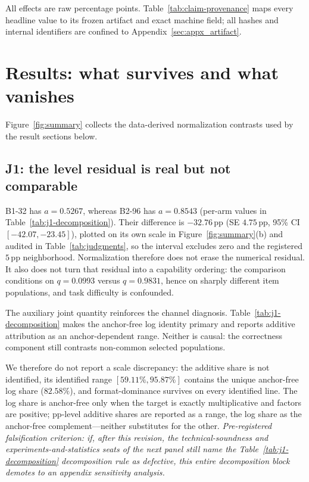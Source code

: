 \documentclass{article}
\newcommand{\pp}{\,\mathrm{pp}}
\begin{document}
All effects are raw percentage points.  Table~\ref{tab:claim-provenance}
maps every headline value to its frozen artifact and exact machine field; all
hashes and internal identifiers are confined to
Appendix~\ref{sec:appx_artifact}.

\section{Results: what survives and what vanishes}
\label{sec:results}

Figure~\ref{fig:summary} collects the data-derived normalization contrasts used
by the result sections below.

\subsection{J1: the level residual is real but not comparable}

\textsc{B1-32} has $a=0.5267$, whereas \textsc{B2-96} has $a=0.8543$
(per-arm values in Table~\ref{tab:j1-decomposition}).  Their difference
is $-32.76\pp$ (SE $4.75\pp$, 95\% CI $[-42.07,-23.45]$), plotted on its own
scale in Figure~\ref{fig:summary}(b) and audited in
Table~\ref{tab:judgments}, so the interval
excludes zero and the registered $5\pp$ neighborhood.  Normalization therefore
does not erase the numerical residual.  It also does not turn that residual
into a capability ordering: the comparison conditions on $q=0.0993$ versus
$q=0.9831$, hence on sharply different item populations, and task difficulty
is confounded.

The auxiliary joint quantity reinforces the channel diagnosis.  Table~\ref{tab:j1-decomposition}
makes the anchor-free log identity primary and reports additive attribution as
an anchor-dependent range.  Neither is causal: the correctness component still
contrasts non-common selected populations.

We therefore do not report a scale discrepancy: the additive share is not
identified, its identified range $[59.11\%,95.87\%]$ contains the unique
anchor-free log share ($82.58\%$), and format-dominance survives on every
identified line.  The log share is anchor-free only when the target is exactly
multiplicative and factors are positive; pp-level additive shares are reported
as a range, the log share as the anchor-free complement---neither substitutes
for the other.  \emph{Pre-registered falsification criterion: if, after this
revision, the technical-soundness and experiments-and-statistics seats of the
next panel still name the Table~\ref{tab:j1-decomposition} decomposition rule
as defective, this entire decomposition block demotes to an appendix
sensitivity analysis.}
\end{document}

